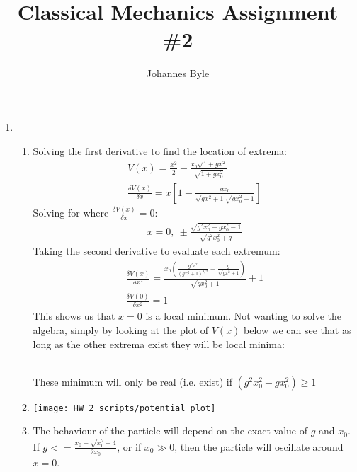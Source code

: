 \documentclass[12pt]{article}
\title{Classical Mechanics Assignment \#2}
\author{Johannes Byle}
\begin{document}
  \maketitle
  \begin{enumerate}
    \item
    \begin{enumerate}
      \item
      Solving the first derivative to find the location of extrema:
      \begin{gather*}
        V(x)=\frac{x^2}{2}-\frac{x_0\sqrt{1+gx^2}}{\sqrt{1+gx_0^2}}\\
        \frac{\delta V(x)}{\delta x}=x\left[1-\frac{gx_0}{\sqrt{gx^2+1}\sqrt{gx_0^2+1}}\right]
      \end{gather*}
      Solving for where $\frac{\delta V(x)}{\delta x}=0$:
      \begin{gather*}
        x=0,\ \pm\frac{\sqrt{g^2 x_0^2-gx_0^2-1}}{\sqrt{g^2 x_0^2+g}}
      \end{gather*}
      Taking the second derivative to evaluate each extremum:
      \begin{gather*}
        \frac{\delta V(x)}{\delta x^2}=\frac{x_0\left(\frac{g^2 x^2}{(gx^2+1)^{3/2}}-\frac{g}{\sqrt{gx^2+1}}\right)}{\sqrt{gx_0^2+1}}+1\\
        \frac{\delta V(0)}{\delta x^2}=1
      \end{gather*}
      This shows us that $x=0$ is a local minimum.
      Not wanting to solve the algebra, simply by looking at the plot of $V(x)$ below we can see that as long as the other extrema exist they will be local minima:\\
      \linebreak
      \\
      These minimum will only be real (i.e. exist) if $(g^2 x_0^2-gx_0^2)\geq 1$\\
      \item
      \texttt{[image: HW\_2\_scripts/potential\_plot]}
      \item The behaviour of the particle will depend on the exact value of $g$ and $x_0$.
      If $g<=\frac{x_0+\sqrt{x_0^2+4}}{2x_0}$, or if $x_0\gg 0$, then the particle will oscillate around $x=0$.

\end{enumerate}
\end{enumerate}
\end{document}
